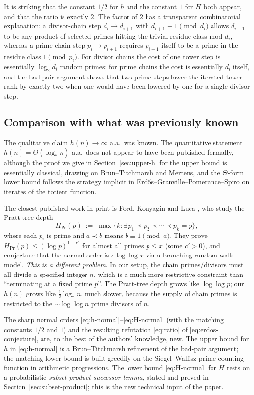 \documentclass[11pt,reqno]{amsart}
\theoremstyle{plain}
\theoremstyle{definition}
\newcommand{\logstar}{\log_{\!*}}
\begin{document}
It is striking that the constant $1/2$ for $h$ and the constant $1$ for $H$ both
appear, and that the ratio is exactly $2$. The factor of $2$ has a transparent
combinatorial explanation: a divisor-chain step $d_i\to d_{i+1}$ with
$d_{i+1}\equiv 1\pmod{d_i}$ allows $d_{i+1}$ to be any product of selected primes
hitting the trivial residue class mod $d_i$, whereas a prime-chain step $p_i\to
p_{i+1}$ requires $p_{i+1}$ itself to be a prime in the residue class
$1\pmod{p_i}$. For divisor chains the cost of one tower step is essentially
$\log_2 d_i$ random primes; for prime chains the cost is essentially $d_i$ itself,
and the bad-pair argument shows that two prime steps lower the iterated-tower
rank by exactly two when one would have been lowered by one for a single
divisor step.

\subsection{Comparison with what was previously known}

The qualitative claim $h(n)\to\infty$ a.a.\ was known. The quantitative
statement $h(n)=\Theta(\logstar n)$ a.a.\ does not appear to have been published
formally, although the proof we give in Section~\ref{sec:upper-h} for the upper
bound is essentially classical, drawing on Brun--Titchmarsh and Mertens, and the
$\Theta$-form lower bound follows the strategy implicit in
Erd\H{o}s--Granville--Pomerance--Spiro \cite{EGPS1990} on iterates of the
totient function.

The closest published work in print is Ford, Konyagin and Luca \cite{FKL2010},
who study the Pratt-tree depth
\[
  H_{\mathrm{Pr}}(p) \;:=\; \max\bigl\{k : \exists\,p_1\prec p_2\prec\cdots\prec p_k = p\bigr\},
\]
where each $p_i$ is prime and $a\prec b$ means $b\equiv 1\pmod a$. They prove
$H_{\mathrm{Pr}}(p)\le (\log p)^{1-c'}$ for almost all primes $p\le x$ (some
$c'>0$), and conjecture that the normal order is $e\log\log x$ via a branching
random walk model. \emph{This is a different problem.} In our setup, the chain
primes/divisors must all divide a specified integer $n$, which is a much more
restrictive constraint than ``terminating at a fixed prime $p$''. The Pratt-tree
depth grows like $\log\log p$; our $h(n)$ grows like $\frac12\logstar n$, much
slower, because the supply of chain primes is restricted to the
$\sim\log\log n$ prime divisors of $n$.

The sharp normal orders \eqref{eq:h-normal}--\eqref{eq:H-normal} (with the
matching constants $1/2$ and $1$) and the resulting refutation
\eqref{eq:ratio} of \eqref{eq:erdos-conjecture}, are, to the best of the authors'
knowledge, new. The upper bound for $h$ in
\eqref{eq:h-normal} is a Brun--Titchmarsh refinement of the bad-pair argument; the
matching lower bound is built greedily on the
Siegel--Walfisz prime-counting function in arithmetic progressions. The
lower bound \eqref{eq:H-normal} for $H$ rests on a probabilistic
\emph{subset-product successor lemma}, stated and proved in
Section~\ref{sec:subset-product}; this is the new technical input of the paper.
\end{document}
